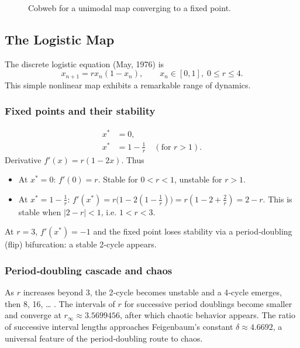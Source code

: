 \documentclass[12pt,a4paper]{book}
\begin{document}
\begin{figure}[H]
\centering
{}
\caption{Cobweb for a unimodal map converging to a fixed point.}
\end{figure}

\subsection{The Logistic Map}
The discrete logistic equation (May, 1976) is
\[
x_{n+1} = r x_n (1 - x_n), \qquad x_n \in [0,1],\; 0 \le r \le 4.
\]
This simple nonlinear map exhibits a remarkable range of dynamics.

\subsubsection{Fixed points and their stability}
\begin{align*}
x^* &= 0, \\
x^* &= 1 - \frac{1}{r} \quad (\text{for } r>1).
\end{align*}
Derivative $f'(x) = r(1-2x)$. Thus
\begin{itemize}
    \item At $x^*=0$: $f'(0)=r$. Stable for $0<r<1$, unstable for $r>1$.
    \item At $x^*=1-\frac{1}{r}$: $f'(x^*) = r\bigl(1-2(1-\frac{1}{r})\bigr) = r(1-2+\frac{2}{r}) = 2-r$. This is stable when $|2-r|<1$, i.e. $1<r<3$.
\end{itemize}
At $r=3$, $f'(x^*)=-1$ and the fixed point loses stability via a period‑doubling (flip) bifurcation: a stable 2‑cycle appears.

\subsubsection{Period‑doubling cascade and chaos}
As $r$ increases beyond $3$, the 2‑cycle becomes unstable and a 4‑cycle emerges, then 8, 16, … . The intervals of $r$ for successive period doublings become smaller and converge at $r_\infty \approx 3.5699456$, after which chaotic behavior appears. The ratio of successive interval lengths approaches Feigenbaum’s constant $\delta \approx 4.6692$, a universal feature of the period‑doubling route to chaos.
\end{document}
